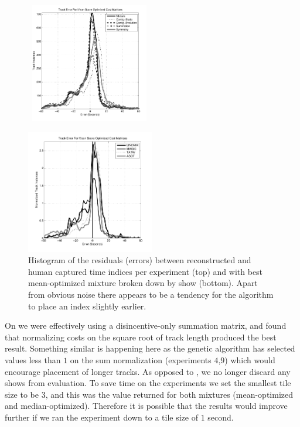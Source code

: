 \documentclass[twocolumn]{article}
\begin{document}
	\begin{figure}
		\centering
		
		\moveright 0.24cm \hbox{
		\includegraphics[width=0.46\textwidth]{images/shift_histogram}
		}
	
		\includegraphics[width=0.5\textwidth]{images/residuals_byshow}
		
		
		
		\caption{Histogram of the residuals (errors) between reconstructed and human captured time indices per experiment (top) and with best mean-optimized mixture broken down by show (bottom). Apart from obvious noise there appears to be a tendency for the algorithm to place an index slightly earlier.    }
		\label{fig:shifthistogram}
	\end{figure} 

On \citep{scarfe2013long} we were effectively using a disincentive-only summation matrix, and found that normalizing costs on the square root of track length produced the best result. Something similar is happening here as the genetic algorithm has selected values less than $1$ on the sum normalization (experiments $4$,$9$) which would encourage placement of longer tracks. As opposed to \citep{scarfe2013long}, we no longer discard any shows from evaluation. To save time on the experiments we set the smallest tile size to be $3$, and this was the value returned for both mixtures (mean-optimized and median-optimized). Therefore it is possible that the results would improve further if we ran the experiment down to a tile size of $1$ second.
\end{document}
